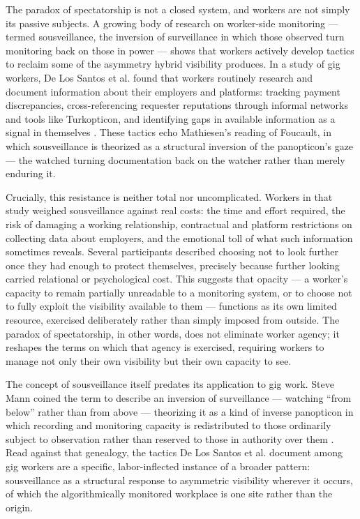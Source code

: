 \documentclass[10pt]{article}
\begin{document}
The paradox of spectatorship is not a closed system, and workers are not simply its passive subjects. A growing body of research on worker-side monitoring --- termed sousveillance, the inversion of surveillance in which those observed turn monitoring back on those in power --- shows that workers actively develop tactics to reclaim some of the asymmetry hybrid visibility produces. In a study of gig workers, De Los Santos et al. found that workers routinely research and document information about their employers and platforms: tracking payment discrepancies, cross-referencing requester reputations through informal networks and tools like Turkopticon, and identifying gaps in available information as a signal in themselves \cite{delossantos}. These tactics echo Mathiesen's reading of Foucault, in which sousveillance is theorized as a structural inversion of the panopticon's gaze --- the watched turning documentation back on the watcher rather than merely enduring it.

Crucially, this resistance is neither total nor uncomplicated. Workers in that study weighed sousveillance against real costs: the time and effort required, the risk of damaging a working relationship, contractual and platform restrictions on collecting data about employers, and the emotional toll of what such information sometimes reveals. Several participants described choosing not to look further once they had enough to protect themselves, precisely because further looking carried relational or psychological cost. This suggests that opacity --- a worker's capacity to remain partially unreadable to a monitoring system, or to choose not to fully exploit the visibility available to them --- functions as its own limited resource, exercised deliberately rather than simply imposed from outside. The paradox of spectatorship, in other words, does not eliminate worker agency; it reshapes the terms on which that agency is exercised, requiring workers to manage not only their own visibility but their own capacity to see.

The concept of sousveillance itself predates its application to gig work. Steve Mann coined the term to describe an inversion of surveillance --- watching ``from below'' rather than from above --- theorizing it as a kind of inverse panopticon in which recording and monitoring capacity is redistributed to those ordinarily subject to observation rather than reserved to those in authority over them \cite{mann}. Read against that genealogy, the tactics De Los Santos et al. document among gig workers are a specific, labor-inflected instance of a broader pattern: sousveillance as a structural response to asymmetric visibility wherever it occurs, of which the algorithmically monitored workplace is one site rather than the origin.
\end{document}
